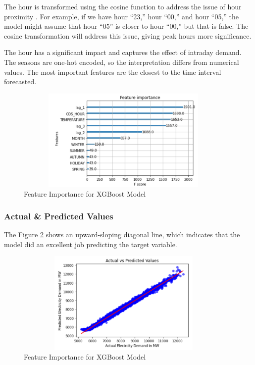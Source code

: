 \documentclass[mstat,12pt]{unswthesis}
\begin{document}
The hour is transformed using the cosine function to address the issue
of hour proximity \cite{avanwyk_2022_encoding}. For example, if we have
hour ``23,'' hour ``00,'' and hour ``05,'' the model might assume that
hour ``05'' is closer to hour ``00,'' but that is false. The cosine
transformation will address this issue, giving peak hours more
significance.

The hour has a significant impact and captures the effect of intraday
demand. The seasons are one-hot encoded, so the interpretation differs
from numerical values. The most important features are the closest to
the time interval forecasted.

\begin{figure}[H]
\centering
\includegraphics[width=0.95\textwidth, height=5cm]{featureimp.png}
\caption{Feature Importance for XGBoost Model}\label{featureimp}
\end{figure}

\hypertarget{actual-predicted-values}{%
\subsubsection{Actual \& Predicted
Values}\label{actual-predicted-values}}

The Figure \ref{actualpredict} shows an upward-sloping diagonal line,
which indicates that the model did an excellent job predicting the
target variable.

\begin{figure}[H]
\centering
\includegraphics[width=0.95\textwidth, height=5cm]{actualpredict.png}
\caption{Feature Importance for XGBoost Model}\label{actualpredict}
\end{figure}
\end{document}
